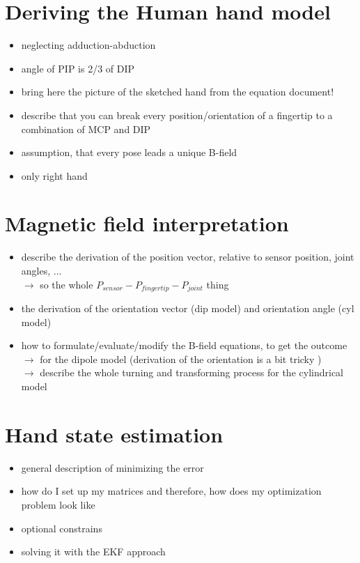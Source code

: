 \section{Deriving the Human hand model} \label{sec:handModel}

\begin{itemize}
\item neglecting adduction-abduction
\item angle of PIP is 2/3 of DIP
\item bring here the picture of the sketched hand from the equation document!
\item describe that you can break every position/orientation of a fingertip to a combination of MCP and DIP
\item assumption, that every pose leads a unique B-field
\item only right hand
\end{itemize}


\section{Magnetic field interpretation } \label{sec:magmodel}

\begin{itemize}
\item describe the derivation of the position vector, relative to sensor position, joint angles, ... \\
		$ \rightarrow $ so the whole $ P_{sensor} - P_{fingertip} - P_{joint} $ thing
\item the derivation of the orientation vector (dip model) and orientation angle (cyl model)
\item how to formulate/evaluate/modify the B-field equations, to get the outcome\\
		$ \rightarrow $ for the dipole model (derivation of the orientation is \grqq a bit tricky \grqq)\\
		$ \rightarrow $ describe the whole turning and transforming process for the cylindrical model
		
\end{itemize}		


\section{Hand state estimation} \label{sec:estimation}

\begin{itemize}
\item general description of minimizing the error
\item how do I set up my matrices and therefore, how does my optimization problem look like
\item optional constrains
\item solving it with the EKF approach
\end{itemize}


